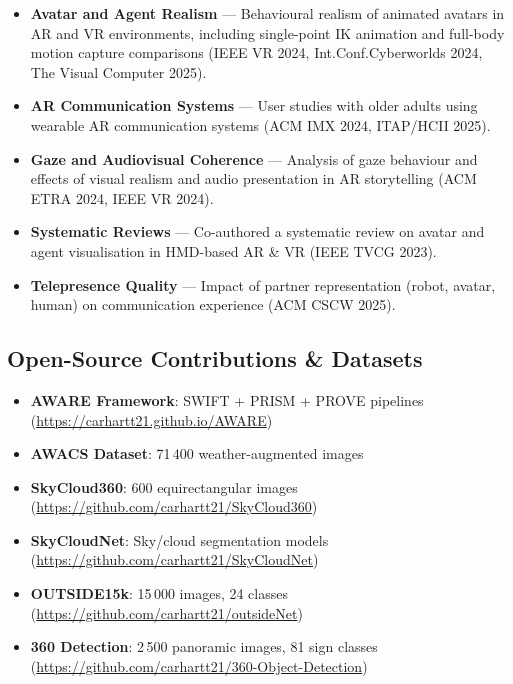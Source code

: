 \documentclass[11pt,a4paper]{article}
\begin{document}
\begin{itemize}[nosep, leftmargin=1.5em, itemsep=3pt]
  \item \textbf{Avatar and Agent Realism} --- Behavioural realism of animated avatars in
    AR and VR environments, including single-point IK animation and full-body
    motion capture comparisons (IEEE VR 2024, Int.\@ Conf.\@ Cyberworlds 2024,
    The Visual Computer 2025).
  \item \textbf{AR Communication Systems} --- User studies with older adults using
    wearable AR communication systems (ACM IMX 2024, ITAP/HCII 2025).
  \item \textbf{Gaze and Audiovisual Coherence} --- Analysis of gaze behaviour and
    effects of visual realism and audio presentation in AR storytelling
    (ACM ETRA 2024, IEEE VR 2024).
  \item \textbf{Systematic Reviews} --- Co-authored a systematic review on avatar and
    agent visualisation in HMD-based AR \& VR (IEEE TVCG 2023).
  \item \textbf{Telepresence Quality} --- Impact of partner representation
    (robot, avatar, human) on communication experience (ACM CSCW 2025).
\end{itemize}

\subsection*{Open-Source Contributions \& Datasets}

\begin{itemize}[nosep, leftmargin=1.5em, itemsep=3pt]
  \item \textbf{AWARE Framework}: SWIFT + PRISM + PROVE pipelines
    (\url{https://carhartt21.github.io/AWARE})
  \item \textbf{AWACS Dataset}: 71\,400 weather-augmented images
  \item \textbf{SkyCloud360}: 600 equirectangular images
    (\url{https://github.com/carhartt21/SkyCloud360})
  \item \textbf{SkyCloudNet}: Sky/cloud segmentation models
    (\url{https://github.com/carhartt21/SkyCloudNet})
  \item \textbf{OUTSIDE15k}: 15\,000 images, 24 classes
    (\url{https://github.com/carhartt21/outsideNet})
  \item \textbf{360\textdegree{} Detection}: 2\,500 panoramic images, 81 sign classes
    (\url{https://github.com/carhartt21/360-Object-Detection})
\end{itemize}
\end{document}
